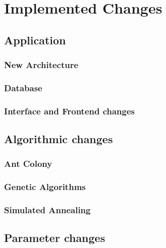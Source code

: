 \chapter{Implemented Changes}
\label{chapter:implementedChanges}

\section{Application}
\label{sec:application}

\subsection{New Architecture}
\label{sec:newArchitecture}

\subsection{Database}
\label{subsection:database}

\subsection{Interface and Frontend changes}
\label{subsec:interfaceAndFrontendChanges}

\section{Algorithmic changes}
\label{sec:algorithmicChanges}

\subsection{Ant Colony}
\label{subsec:antColonyImplementation}

\subsection{Genetic Algorithms}
\label{subsec:geneticAlgorithmsImplementation}

\subsection{Simulated Annealing}
\label{subsec:simulatedAnnealingImplementation}

\section{Parameter changes}
\label{sec:parameterChanges}

